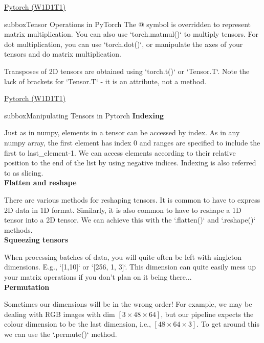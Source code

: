 \begin{multicols}{3}
\begin{textbox}{\href{https://deeplearning.neuromatch.io/tutorials/W1D1_BasicsAndPytorch/student/W1D1_Tutorial1.html}{Pytorch (W1D1T1) }}
\begin{subbox}{subbox}{Tensor Operations in PyTorch}
The \textit{$@$} symbol is overridden to represent matrix multiplication. You can also use `torch.matmul()` to multiply tensors. For dot multiplication, you can use `torch.dot()`, or manipulate the axes of your tensors and do matrix multiplication. 

Transposes of 2D tensors are obtained using `torch.t()` or `Tensor.T`. Note the lack of brackets for `Tensor.T` - it is an attribute, not a method.

\end{subbox}
\end{textbox}
\begin{textbox}{\href{https://deeplearning.neuromatch.io/tutorials/W1D1_BasicsAndPytorch/student/W1D1_Tutorial1.html}{Pytorch (W1D1T1) }}

\begin{subbox}{subbox}{Manipulating Tensors in Pytorch}
\scriptsize
\textbf{Indexing}

Just as in numpy, elements in a tensor can be accessed by index. As in any numpy array, the first element has index 0 and ranges are specified to include the first to last\_element-1. We can access elements according to their relative position to the end of the list by using negative indices. Indexing is also referred to as slicing.\\

\textbf{Flatten and reshape}

There are various methods for reshaping tensors. It is common to have to express 2D data in 1D format. Similarly, it is also common to have to reshape a 1D tensor into a 2D tensor. We can achieve this with the `.flatten()` and `.reshape()` methods.\\

\textbf{Squeezing tensors}

When processing batches of data, you will quite often be left with singleton dimensions. E.g., `[1,10]` or `[256, 1, 3]`. This dimension can quite easily mess up your matrix operations if you don't plan on it being there...\\



\textbf{Permutation}

Sometimes our dimensions will be in the wrong order! For example, we may be dealing with RGB images with dim $[3\times48\times64]$, but our pipeline expects the colour dimension to be the last dimension, i.e., $[48\times64\times3]$. To get around this we can use the `.permute()` method.\\


\end{subbox}
\end{textbox}
\end{multicols}
